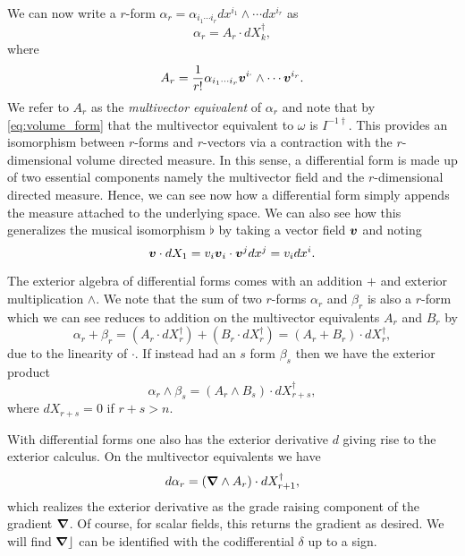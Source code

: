 We can now write a $r$-form $\alpha_r = \alpha_{i_1 \cdots i_r} dx^{i_1}\wedge \cdots dx^{i_r}$ as 
\begin{equation}
\alpha_r = A_r \cdot dX_k^\dagger,
\end{equation}
where
\begin{equation}
A_r = \frac{1}{r!} \alpha_{i_1 \cdots i_r} \boldsymbol{v}^{i_`} \wedge \cdots \boldsymbol{v}^{i_r}.
\end{equation}
We refer to $A_r$ as the \emph{multivector equivalent} of $\alpha_r$ and note that by \cref{eq:volume_form} that the multivector equivalent to $\omega$ is $I^{-1 \dagger}$. This provides an isomorphism between $r$-forms and $r$-vectors via a contraction with the $r$-dimensional volume directed measure. In this sense, a differential form is made up of two essential components namely the multivector field and the $r$-dimensional directed measure. Hence, we can see now how a differential form simply appends the measure attached to the underlying space. We can also see how this generalizes the musical isomorphism $\flat$ by taking a vector field $\boldsymbol{v}$ and noting
\begin{equation}
\label{eq:line_element}
\boldsymbol{v} \cdot dX_1 = v_i  \boldsymbol{v}_i \cdot \boldsymbol{v}^j dx^j = v_i dx^i.
\end{equation}

The exterior algebra of differential forms comes with an addition $+$ and exterior multiplication $\wedge$.  We note that the sum of two $r$-forms $\alpha_r$ and $\beta_r$ is also a $r$-form which we can see reduces to addition on the multivector equivalents $A_r$ and $B_r$ by
\begin{equation}
\alpha_r + \beta_r = (A_r \cdot dX_r^\dagger)+(B_r \cdot dX_r^\dagger) = (A_r + B_r) \cdot dX_r^\dagger,
\end{equation}
due to the linearity of $\cdot$.  If instead had an $s$ form $\beta_s$ then we have the exterior product
\begin{equation}
\alpha_r \wedge \beta_s = (A_r \wedge B_s) \cdot dX_{r+s}^\dagger,
\end{equation}
where $dX_{r+s}=0$ if $r+s>n$.  

With differential forms one also has the exterior derivative $d$ giving rise to the exterior calculus. On the multivector equivalents we have
\begin{equation}
d \alpha_r = (\boldsymbol{\nabla} \wedge A_r) \cdot dX_{r+1}^\dagger,
\end{equation}
which realizes the exterior derivative as the grade raising component of the gradient $\boldsymbol{\nabla}$. Of course, for scalar fields, this returns the gradient as desired. We will find $\boldsymbol{\nabla} \rfloor$ can be identified with the codifferential $\delta$ up to a sign. 

